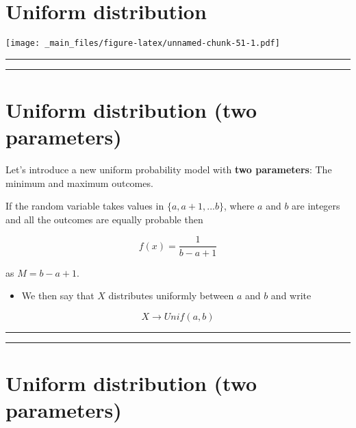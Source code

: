 \documentclass[
]{book}
\providecommand{\tightlist}{%
  \setlength{\itemsep}{0pt}\setlength{\parskip}{0pt}}
\begin{document}
\hypertarget{uniform-distribution}{%
\section{Uniform distribution}\label{uniform-distribution}}

\texttt{[image: \_main\_files/figure-latex/unnamed-chunk-51-1.pdf]}

\begin{center}\rule{0.5\linewidth}{0.5pt}\end{center}

\begin{center}\rule{0.5\linewidth}{0.5pt}\end{center}

\hypertarget{uniform-distribution-two-parameters}{%
\section{Uniform distribution (two parameters)}\label{uniform-distribution-two-parameters}}

Let's introduce a new uniform probability model with \textbf{two parameters}: The minimum and maximum outcomes.

If the random variable takes values in \(\{a, a+1, ...b\}\), where \(a\) and \(b\) are integers and all the outcomes are equally probable then

\[f(x)=\frac{1}{b-a+1}\]

as \(M=b-a+1\).

\begin{itemize}
\tightlist
\item
  We then say that \(X\) distributes uniformly between \(a\) and \(b\) and write
\end{itemize}

\[X \rightarrow Unif(a,b)\]

\begin{center}\rule{0.5\linewidth}{0.5pt}\end{center}

\begin{center}\rule{0.5\linewidth}{0.5pt}\end{center}

\hypertarget{uniform-distribution-two-parameters-1}{%
\section{Uniform distribution (two parameters)}\label{uniform-distribution-two-parameters-1}}
\end{document}
